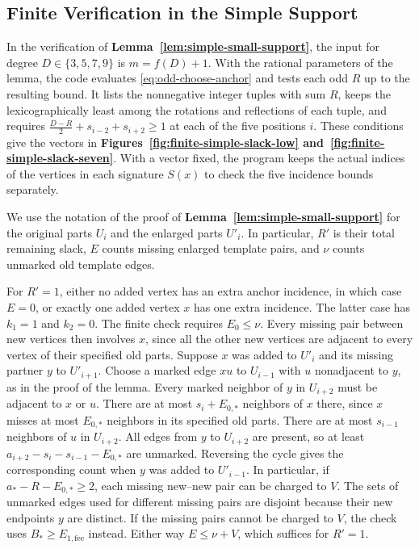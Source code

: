 \subsection{Finite Verification in the Simple Support}\label{app:odd-small}

In the verification of \textbf{Lemma~\ref{lem:simple-small-support}},
the input for degree $D\in\{3,5,7,9\}$ is $m=f(D)+1$.
With the rational parameters of the lemma, the code evaluates
\eqref{eq:odd-choose-anchor} and tests each odd $R$ up to the resulting
bound. It lists the nonnegative integer tuples with sum $R$, keeps the
lexicographically least among the rotations and reflections of each tuple,
and requires $\frac{D-R}{2}+s_{i-2}+s_{i+2}\geq1$ at each of the
five positions $i$. These conditions give the vectors in
\textbf{Figures~\ref{fig:finite-simple-slack-low}
and~\ref{fig:finite-simple-slack-seven}}. With a vector fixed, the
program keeps the actual indices of the vertices in each signature
$S(x)$ to check the five incidence bounds separately.

We use the notation of the proof of \textbf{Lemma~\ref{lem:simple-small-support}}
for the original parts $U_i$ and the enlarged parts $U'_i$. In particular,
$R'$ is their total remaining slack, $E$ counts missing enlarged template
pairs, and $\nu$ counts unmarked old template edges.

For $R'=1$, either no added vertex has an extra anchor incidence,
in which case $E=0$, or exactly one added vertex $x$ has one extra
incidence. The latter case has $k_1=1$ and $k_2=0$. The finite check
requires $E_0\leq \nu$. Every missing pair between new vertices then involves
$x$, since all the other new vertices are adjacent to every vertex
of their specified old parts. Suppose $x$ was added to $U'_i$ and
its missing partner $y$ to $U'_{i+1}$. Choose a marked edge $xu$ to
$U_{i-1}$ with $u$ nonadjacent to $y$, as in the proof of the lemma.
Every marked neighbor of $y$ in $U_{i+2}$ must be adjacent to $x$
or $u$. There are at most $s_i+E_{0,*}$ neighbors of $x$ there, since
$x$ misses at most $E_{0,*}$ neighbors in its specified old parts.
There are at most $s_{i-1}$ neighbors of $u$ in $U_{i+2}$.
All edges from $y$ to $U_{i+2}$ are present, so at least
$a_{i+2}-s_i-s_{i-1}-E_{0,*}$ are unmarked. Reversing the cycle
gives the corresponding count when $y$ was added to $U'_{i-1}$.
In particular, if $a_*-R-E_{0,*}\geq2$, each missing new--new
pair can be charged to $V$. The sets of unmarked edges used for
different missing pairs are disjoint because their new endpoints
$y$ are distinct. If the missing pairs cannot be charged to $V$,
the check uses $B_*\geq E_{1,\mathrm{fee}}$ instead. Either way
$E\leq \nu+V$, which suffices for $R'=1$.

